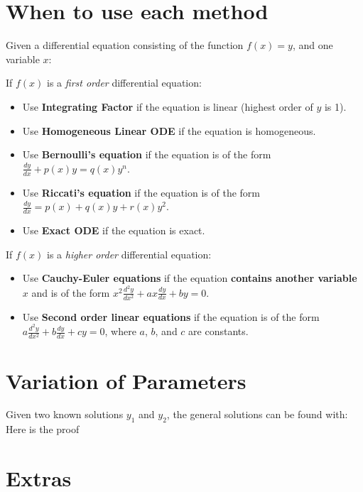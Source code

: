 \documentclass{scrartcl}
\begin{document}
\section{When to use each method}
Given a differential equation consisting of the function \(f(x) = y\), and one variable \(x\):

If \(f(x)\) is a \textit{first order} differential equation:
\begin{itemize}
    \item Use \textbf{Integrating Factor} if the equation is linear (highest order of \(y\) is 1).
    \item Use \textbf{Homogeneous Linear ODE} if the equation is homogeneous.
    \item Use \textbf{Bernoulli's equation} if the equation is of the form \(\frac{dy}{dx} + p(x)y = q(x)y^n\).
    \item Use \textbf{Riccati's equation} if the equation is of the form \(\frac{dy}{dx} = p(x) + q(x)y + r(x)y^2\).
    \item Use \textbf{Exact ODE} if the equation is exact.
\end{itemize}

If \(f(x)\) is a \textit{higher order} differential equation:
\begin{itemize}
    \item Use \textbf{Cauchy-Euler equations} if the equation \textbf{contains another variable \(x\)} and is of the form \(x^2\frac{d^2y}{dx^2} + a x \frac{dy}{dx} + b y = 0\).
    \item Use \textbf{Second order linear equations} if the equation is of the form \(a\frac{d^2y}{dx^2} + b\frac{dy}{dx} + cy = 0\), where \(a\), \(b\), and \(c\) are constants.
\end{itemize}


\section{Variation of Parameters}
Given two known solutions \(y_1\) and \(y_2\), the general solutions can be found with:
Here is the proof


\section{Extras}
\end{document}

